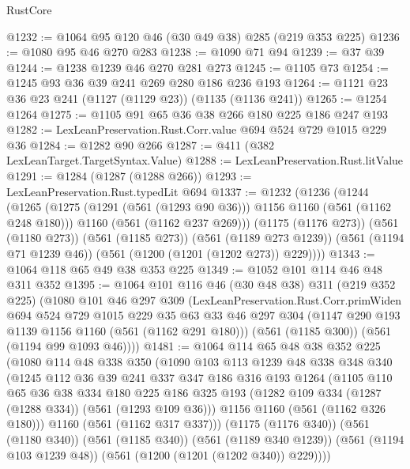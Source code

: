 \begin{lexlean}{RustCore}
\begin{coremodule}
@1232 := @1064 @95 @120 @46 (@30 @49 @38) @285 (@219 @353 @225)
@1236 := @1080 @95 @46 @270 @283
@1238 := @1090 @71 @94
@1239 := @37 @39
@1244 := @1238 @1239 @46 @270 @281 @273
@1245 := @1105 @73
@1254 := @1245 @93 @36 @39 @241 @269 @280 @186 @236 @193
@1264 := @1121 @23 @36 @23 @241 (@1127 (@1129 @23)) (@1135 (@1136 @241))
@1265 := @1254 @1264
@1275 := @1105 @91 @65 @36 @38 @266 @180 @225 @186 @247 @193
@1282 := LexLeanPreservation.Rust.Corr.value @694 @524 @729 @1015 @229 @36
@1284 := @1282 @90 @266
@1287 := @411 (@382 LexLeanTarget.TargetSyntax.Value)
@1288 := LexLeanPreservation.Rust.litValue
@1291 := @1284 (@1287 (@1288 @266))
@1293 := LexLeanPreservation.Rust.typedLit @694
@1337 := @1232
    (@1236
      (@1244
        (@1265
          (@1275 (@1291 (@561 (@1293 @90 @36))) @1156 @1160 (@561 (@1162 @248 @180)))
          @1160
          (@561 (@1162 @237 @269)))
        (@1175 (@1176 @273))
        (@561 (@1180 @273))
        (@561 (@1185 @273))
        (@561 (@1189 @273 @1239))
        (@561 (@1194 @71 @1239 @46))
        (@561 (@1200 (@1201 (@1202 @273)) @229))))
@1343 := @1064 @118 @65 @49 @38 @353 @225
@1349 := @1052 @101 @114 @46 @48 @311 @352
@1395 := @1064
    @101
    @116
    @46
    (@30 @48 @38)
    @311
    (@219 @352 @225)
    (@1080
      @101
      @46
      @297
      @309
      (LexLeanPreservation.Rust.Corr.primWiden
        @694
        @524
        @729
        @1015
        @229
        @35
        @63
        @33
        @46
        @297
        @304
        (@1147 @290 @193 @1139 @1156 @1160 (@561 (@1162 @291 @180)))
        (@561 (@1185 @300))
        (@561 (@1194 @99 @1093 @46))))
@1481 := @1064
    @114
    @65
    @48
    @38
    @352
    @225
    (@1080
      @114
      @48
      @338
      @350
      (@1090
        @103
        @113
        @1239
        @48
        @338
        @348
        @340
        (@1245
          @112
          @36
          @39
          @241
          @337
          @347
          @186
          @316
          @193
          @1264
          (@1105
            @110
            @65
            @36
            @38
            @334
            @180
            @225
            @186
            @325
            @193
            (@1282 @109 @334 (@1287 (@1288 @334)) (@561 (@1293 @109 @36)))
            @1156
            @1160
            (@561 (@1162 @326 @180)))
          @1160
          (@561 (@1162 @317 @337)))
        (@1175 (@1176 @340))
        (@561 (@1180 @340))
        (@561 (@1185 @340))
        (@561 (@1189 @340 @1239))
        (@561 (@1194 @103 @1239 @48))
        (@561 (@1200 (@1201 (@1202 @340)) @229))))

\end{coremodule}
\end{lexlean}
